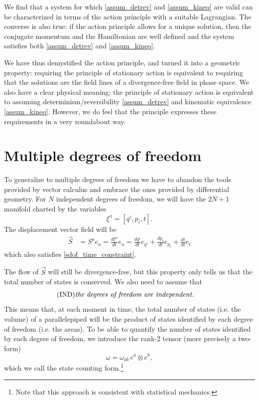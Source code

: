 \documentclass[10pt,twocolumn, nofootinbib]{revtex4-2}
\begin{document}
We find that a system for which \ref{assum_detrev} and \ref{assum_kineq} are valid can be characterized in terms of the action principle with a suitable Lagrangian. The converse is also true: if the action principle allows for a unique solution, then the conjugate momentum and the Hamiltonian are well defined and the system satisfies both \ref{assum_detrev} and \ref{assum_kineq}.

We have thus demystified the action principle, and turned it into a geometric property: requiring the principle of stationary action is equivalent to requiring that the solutions are the field lines of a divergence-free field in phase space. We also have a clear physical meaning: the principle of stationary action is equivalent to assuming determinism/reversibility \ref{assum_detrev} and kinematic equivalence \ref{assum_kineq}. However, we do feel that the principle expresses these requirements in a very roundabout way.

\section{Multiple degrees of freedom}

To generalize to multiple degrees of freedom we have to abandon the tools provided by vector calculus and embrace the ones provided by differential geometry. For $N$ independent degrees of freedom, we will have the $2N+1$ manifold charted by the variables
\begin{equation}\label{mdof_variables}
	\xi^a = [ q^i, p_i, t].
\end{equation}
The displacement vector field will be
\begin{equation}\label{mdof_displacement}
	\begin{aligned}
		\vec{S} &= S^a e_a = \frac{d\xi^a}{dt} e_a =\frac{dq^i}{dt} e_{q^i} + \frac{dp_i}{dt} e_{p_i} + \frac{dt}{dt} e_t
	\end{aligned}
\end{equation}
which also satisfies \ref{sdof_time_constraint}.

The flow of $\vec{S}$ will still be divergence-free, but this property only tells us that the total number of states is conserved. We also need to assume that
\begin{align}\label{assum_indep}
	\tag*{(IND)}
	\parbox{2.8in}{\emph{the degrees of freedom are independent.}}
\end{align}
This means that, at each moment in time, the total number of states (i.e. the volume) of a parallelepiped will be the product of states identified by each degree of freedom (i.e. the areas). To be able to quantify the number of states identified by each degree of freedom, we introduce the rank-2 tensor (more precisely a two-form)
\begin{equation}\label{mdof_form}
	\omega = \omega_{ab} \, e^a \otimes e^b,
\end{equation}
which we call the state counting form.\footnote{Note that this approach is consistent with statistical mechanics\cite{peliti2011statistical}.}
\end{document}
